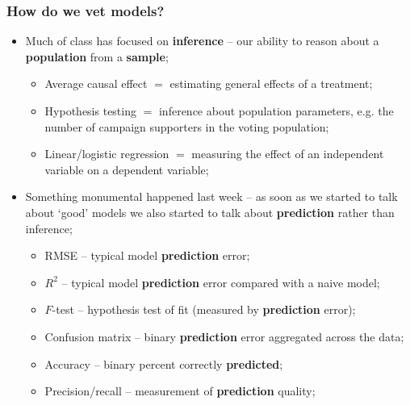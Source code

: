 \documentclass[aspectratio=169]{beamer}
\theoremstyle{principle}
\begin{document}
\begin{frame}
\frametitle{How do we vet models?}

\begin{itemize}
\item Much of class has focused on \textbf{inference} -- our ability to reason about a \textbf{population} from a \textbf{sample};
\begin{itemize}
\item Average causal effect $=$ estimating general effects of a treatment;
\item Hypothesis testing $=$ inference about population parameters, e.g. the number of campaign supporters in the voting population;
\item Linear/logistic regression $=$ measuring the effect of an independent variable on a dependent variable;
\end{itemize}
\bigskip

\item[]\color{white} Something monumental happened last week -- as soon as we started to talk about `good' models we also started to talk about \textbf{prediction} rather than inference;
\begin{itemize}
\item[]\color{white} RMSE -- typical model \textbf{prediction} error;
\item[]\color{white} $R^2$ -- typical model \textbf{prediction} error compared with a naive model;
\item[]\color{white} $F$-test -- hypothesis test of fit (measured by \textbf{prediction} error);
\item[]\color{white} Confusion matrix -- binary \textbf{prediction} error aggregated across the data;
\item[]\color{white} Accuracy -- binary percent correctly \textbf{predicted};
\item[]\color{white} Precision/recall -- measurement of \textbf{prediction} quality;
\end{itemize}
\end{itemize}
\end{frame}
\end{document}

